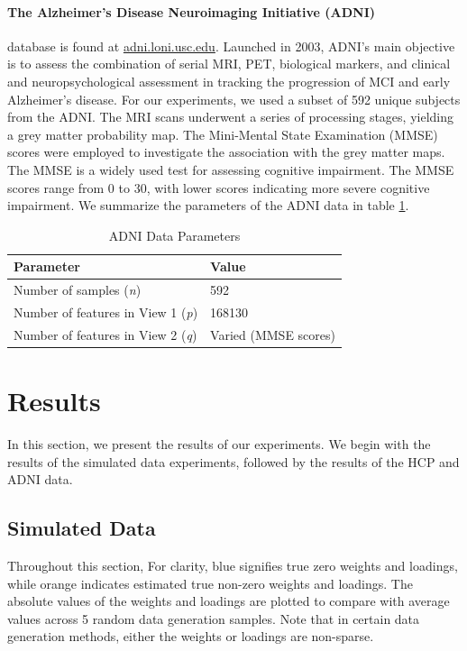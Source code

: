 \paragraph{The Alzheimer’s Disease Neuroimaging Initiative (ADNI)} database is found at \url{adni.loni.usc.edu}.
Launched in 2003, ADNI's main objective is to assess the combination of serial MRI, PET, biological markers, and clinical and neuropsychological assessment in tracking the progression of MCI and early Alzheimer’s disease.
For our experiments, we used a subset of 592 unique subjects from the ADNI. The MRI scans underwent a series of processing stages, yielding a grey matter probability map.
The Mini-Mental State Examination (MMSE) scores were employed to investigate the association with the grey matter maps.
The MMSE is a widely used test for assessing cognitive impairment.
The MMSE scores range from 0 to 30, with lower scores indicating more severe cognitive impairment.
We summarize the parameters of the ADNI data in table \ref{table:adni-parameters}.

\begin{table}
\centering
\caption{ADNI Data Parameters}
\begin{tabular}{| l | l |}
\hline
\textbf{Parameter} & \textbf{Value} \\
\hline
Number of samples (\textit{n}) & 592 \\
Number of features in View 1 (\textit{p}) & 168130 \\
Number of features in View 2 (\textit{q}) & Varied (MMSE scores) \\
\hline
\end{tabular}
\label{table:adni-parameters}
\end{table}

\section{Results}

In this section, we present the results of our experiments.
We begin with the results of the simulated data experiments, followed by the results of the HCP and ADNI data.

\subsection{Simulated Data}

Throughout this section, For clarity, blue signifies true zero weights and loadings, while orange indicates estimated true non-zero weights and loadings.
The absolute values of the weights and loadings are plotted to compare with average values across 5 random data generation samples.
Note that in certain data generation methods, either the weights or loadings are non-sparse.

